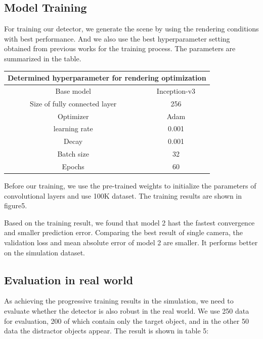 \subsection{Model Training}
For training our detector, we generate the scene by using the rendering conditions with best performance. And we also use the best hyperparameter setting obtained from previous works for the training process. The parameters are summarized in the table.
\begin{table}[]
	\begin{tabular}{|c|c|}
		\hline
		\multicolumn{2}{|l|}{\textbf{Determined hyperparameter for rendering optimization}} \\ \hline
		Base model & Inception-v3 \\ \hline
		Size of fully connected layer & 256 \\ \hline
		Optimizer & Adam \\ \hline
		learning rate & 0.001 \\ \hline
		Decay & 0.001 \\ \hline
		Batch size & 32 \\ \hline
		Epochs & 60 \\ \hline
	\end{tabular}
\end{table}

Before our training, we use the pre-trained weights to initialize the parameters of convolutional layers and use 100K dataset. The training results are shown in figure5.

\missingfigure{}

Based on the training result, we found that model 2 hast the fastest convergence and smaller prediction error. Comparing the best result of single camera, the validation loss and mean absolute error of model 2 are smaller. It performs better on the simulation dataset.

\subsection{Evaluation in real world}
As achieving the progressive training results in the simulation, we need to evaluate whether the detector is also robust in the real world. We use 250 data for evaluation, 200 of which contain only the target object, and in the other 50 data the distractor objects appear. The result is shown in table 5:

